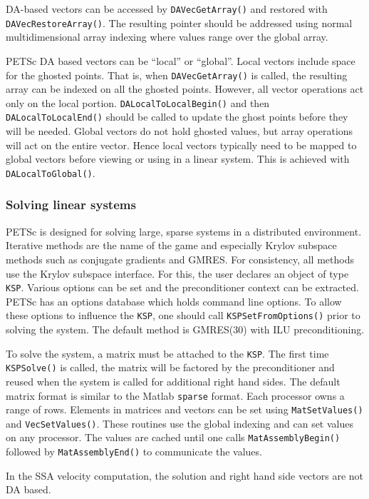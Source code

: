 \documentclass[11pt,final]{amsart}
\renewcommand{\t}[1]{\texttt{#1}}
\begin{document}
DA-based vectors can be accessed by \texttt{DAVecGetArray()} and restored with
\texttt{DAVecRestoreArray()}. The resulting pointer should be addressed using normal
multidimensional array indexing where values range over the global array.

PETSc DA based vectors can be ``local'' or ``global''. Local vectors include space for the
ghosted points. That is, when \texttt{DAVecGetArray()} is called, the resulting array can
be indexed on all the ghosted points. However, all vector operations act only on the local
portion. \texttt{DALocalToLocalBegin()} and then \texttt{DALocalToLocalEnd()} should be
called to update the ghost points before they will be needed. Global vectors do not hold
ghosted values, but array operations will act on the entire vector. Hence local vectors
typically need to be mapped to global vectors before viewing or using in a linear system.
This is achieved with \texttt{DALocalToGlobal()}.

\subsubsection*{Solving linear systems}
PETSc is designed for solving large, sparse systems in a distributed environment.
Iterative methods are the name of the game and especially Krylov subspace methods such as
conjugate gradients and GMRES. For consistency, all methods use the Krylov subspace
interface. For this, the user declares an object of type \texttt{KSP}. Various options can
be set and the preconditioner context can be extracted. PETSc has an options database
which holds command line options. To allow these options to influence the \t{KSP}, one
should call \t{KSPSetFromOptions()} prior to solving the system. The default method is
GMRES(30) with ILU preconditioning.

To solve the system, a matrix must be attached to the \t{KSP}. The first time
\t{KSPSolve()} is called, the matrix will be factored by the preconditioner and reused
when the system is called for additional right hand sides. The default matrix format is
similar to the Matlab \t{sparse} format. Each processor owns a range of rows. Elements in
matrices and vectors can be set using \t{MatSetValues()} and \t{VecSetValues()}. These
routines use the global indexing and can set values on any processor. The values are
cached until one calls \t{MatAssemblyBegin()} followed by \t{MatAssemblyEnd()} to
communicate the values.

In the SSA velocity computation, the solution and right hand side vectors are not DA
based.
\end{document}
